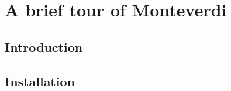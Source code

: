 \chapter{A brief tour of Monteverdi}\label{chap:Monteverdi}

\section{Introduction}\label{sec:montintro}

\section{Installation}\label{sec:montinstall}
